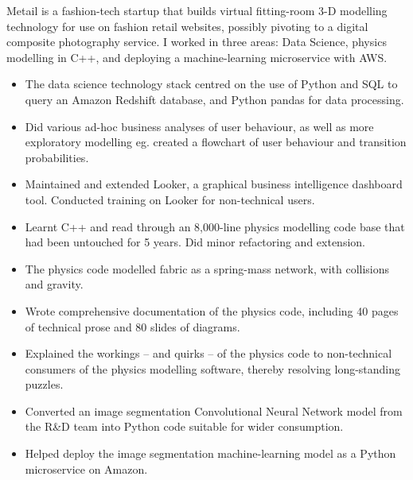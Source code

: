 \documentclass[11pt,a4paper,sans]{moderncv} %
\begin{document}
{Metail is a fashion-tech startup that builds virtual fitting-room 3-D modelling technology for use on fashion retail websites, possibly pivoting to a digital composite photography service.  I worked in three areas: Data Science, physics modelling in C++, and deploying a machine-learning microservice with AWS.
	\begin{itemize}
		\item The data science technology stack centred on the use of Python and SQL to query an Amazon Redshift database, and Python pandas for data processing.
		\item Did various ad-hoc business analyses of user behaviour, as well as more exploratory modelling eg. created a flowchart of user behaviour and transition probabilities.
		\item Maintained and extended Looker, a graphical business intelligence dashboard tool.  Conducted training on Looker for non-technical users.
		\item Learnt C++ and read through an 8,000-line physics modelling code base that had been untouched for 5 years.  Did minor refactoring and extension.
		\item The physics code modelled fabric as a spring-mass network, with collisions and gravity.
		\item Wrote comprehensive documentation of the physics code, including 40 pages of technical prose and 80 slides of diagrams.
		\item Explained the workings -- and quirks -- of the physics code to non-technical consumers of the physics modelling software, thereby resolving long-standing puzzles.
		\item Converted an image segmentation Convolutional Neural Network model from the R\&D team into Python code suitable for wider consumption.
		\item Helped deploy the image segmentation machine-learning model as a Python microservice on Amazon.
	\end{itemize}
}
\end{document}
